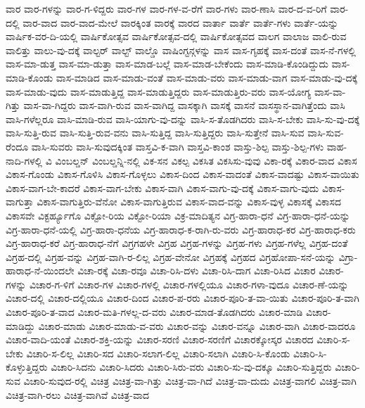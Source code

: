 {ವಾರ
ವಾರ-ಗಳನ್ನು
ವಾರ-ಗ-ಳಿದ್ದರು
ವಾರ-ಗಳ
ವಾರ-ಗಳ-ವ-ರೆಗೆ
ವಾರ-ಗಳು
ವಾರ-ಣಾಸಿ
ವಾರ-ದ-ವ-ರಿಗೆ
ವಾರ-ದಲ್ಲಿ
ವಾರ-ವಾದ
ವಾರ-ವಾದ-ಮೇಲೆ
ವಾರಕ್ಕಿಂತ
ವಾರಕ್ಕೆ
ವಾರದ
ವಾರ್ತಾ
ವಾರ್ತೆ
ವಾರ್ತೆ-ಗಳು
ವಾರ್ತೆ-ಯನ್ನು
ವಾರ್ಷಿಕ-ವರ-ದಿ-ಯಲ್ಲಿ
ವಾರ್ಷಿಕೋತ್ಸವ
ವಾರ್ಷಿಕೋತ್ಸವ-ದಲ್ಲಿ
ವಾರ್ಷಿಕೋತ್ಸವದ
ವಾಲಗ
ವಾಲಾಜ
ವಾಲಿ-ರುವ
ವಾಲಿತ್ತು
ವಾಲು-ವು-ದಕ್ಕೆ
ವಾಲ್ಟರ್
ವಾಲ್ಟ್
ವಾಲ್ಡೊ
ವಾಷಿಂಗ್ಟನ್ಗಳನ್ನು
ವಾಸ
ವಾಸ-ಗೃಹಕ್ಕೆ
ವಾಸ-ದಂತೆ
ವಾಸ-ನೆ-ಗಳಲ್ಲಿ
ವಾಸ-ಮಾ-ಡುತ್ತ
ವಾಸ-ಮಾ-ಡುತ್ತಾ
ವಾಸ-ಮಾಡ-ಬಲ್ಲೆ
ವಾಸ-ಮಾಡ-ಬೇಕೆಂದು
ವಾಸ-ಮಾಡಿ-ಕೊಂಡಿದ್ದುದು
ವಾಸ-ಮಾಡಿ-ಕೊಂಡು
ವಾಸ-ಮಾಡಿದ
ವಾಸ-ಮಾಡು-ವಂತೆ
ವಾಸ-ಮಾಡು-ವರು
ವಾಸ-ಮಾಡು-ವಾಗ
ವಾಸ-ಮಾಡು-ವು-ದಕ್ಕೆ
ವಾಸ-ಮಾಡು-ವುದು
ವಾಸ-ಮಾಡುತ್ತಿದ್ದ
ವಾಸ-ಮಾಡುತ್ತಿದ್ದರು
ವಾಸ-ಮಾಡುತ್ತಿರು-ವರು
ವಾಸ-ಯೋಗ್ಯ
ವಾಸ-ವಾ-ಗಿತ್ತು
ವಾಸ-ವಾ-ಗಿದ್ದರು
ವಾಸ-ವಾಗಿ-ರುವ
ವಾಸ-ವಾಗಿದ್ದ
ವಾಸಕ್ಕಾಗಿ
ವಾಸಕ್ಕೆ
ವಾಸನೆ
ವಾಸಸ್ಥಾನ-ವಾಗಿತ್ತೆಂದು
ವಾಸಿ
ವಾಸಿ-ಗಳೆಲ್ಲರೂ
ವಾಸಿ-ಮಾಡಿ-ರುವ
ವಾಸಿ-ಯಾಗು-ವು-ದನ್ನು
ವಾಸಿ-ಸ-ತೊಡಗಿದರು
ವಾಸಿ-ಸ-ಬೇಕು
ವಾಸಿ-ಸು-ವು-ದಕ್ಕೆ
ವಾಸಿ-ಸುತ್ತಿ-ರುವ
ವಾಸಿ-ಸುತ್ತಿ-ರುವ-ವನು
ವಾಸಿ-ಸುತ್ತಿದ್ದ
ವಾಸಿ-ಸುತ್ತಿದ್ದರು
ವಾಸಿ-ಸುತ್ತೇನೆ
ವಾಸಿ-ಸುವ
ವಾಸಿ-ಸುವ-ರೆಂದೂ
ವಾಸಿ-ಸುವರು
ವಾಸಿ-ಸುವುದಕ್ಕಿಂತ
ವಾಸ್ತವಿ-ಕ-ವಾಗಿ
ವಾಸ್ತವಿ-ಕಾಂಶ
ವಾಸ್ತು-ಶಿಲ್ಪ
ವಾಸ್ತು-ಶಿಲ್ಪ-ಗಳು
ವಾಹ-ನಾದಿ-ಗಳಲ್ಲಿ
ವಿ
ವಿಂಬಲ್ಡನ್
ವಿಂಬಲ್ಡನ್ನಿ-ನಲ್ಲಿ
ವಿಕ-ಸನ
ವಿಕಲ್ಪ
ವಿಕಸಿತ
ವಿಕಸಿಸು-ವುವು
ವಿಕಾ-ರಕ್ಕೆ
ವಿಕಾರ-ವಾದ
ವಿಕಾಸ
ವಿಕಾಸ-ಗೊಂಡು
ವಿಕಾಸ-ಗೊಳಿಸಿ
ವಿಕಾಸ-ಗೊಳ್ಳಲು
ವಿಕಾಸ-ದಿಂದ
ವಿಕಾಸ-ವಾದಂತೆ
ವಿಕಾಸ-ವಾದಷ್ಟು
ವಿಕಾಸ-ವಾಯಿತು
ವಿಕಾಸ-ವಾಗ-ಬೇ-ಕಾದರೆ
ವಿಕಾಸ-ವಾಗ-ಬೇಕು
ವಿಕಾಸ-ವಾಗಿ
ವಿಕಾಸ-ವಾಗು-ವು-ದಕ್ಕೆ
ವಿಕಾಸ-ವಾಗು-ವುದು
ವಿಕಾಸ-ವಾಗುತ್ತಾ
ವಿಕಾಸ-ವಾಗುತ್ತಿರು-ವೆನೋ
ವಿಕಾಸ-ವಾಗುತ್ತಿರುವ
ವಿಕಾಸ-ವಾದ-ವನ್ನು
ವಿಕಾಸ-ವುಳ್ಳ
ವಿಕಾಸಕ್ಕೆ
ವಿಕಾಸದ
ವಿಕಾಸವೇ
ವಿಕ್ಟರ್ಹ್ಯೂಗೊ
ವಿಕ್ಟೋ-ರಿಯ
ವಿಕ್ಟೋ-ರಿಯಾ
ವಿಕ್ರ-ಮಾದಿತ್ಯನ
ವಿಗ್ರ-ಹಾರಾ-ಧನೆ
ವಿಗ್ರ-ಹಾರಾ-ಧನೆ-ಯನ್ನು
ವಿಗ್ರ-ಹಾರಾ-ಧನೆ-ಯಲ್ಲಿ
ವಿಗ್ರ-ಹಾರಾ-ಧನೆಯ
ವಿಗ್ರ-ಹಾರಾಧ-ಕ-ರಾಗಿ-ರು-ವರು
ವಿಗ್ರ-ಹಾರಾಧ-ಕರ
ವಿಗ್ರ-ಹಾರಾಧ-ಕರು
ವಿಗ್ರ-ಹಾರಾಧ-ಕರೆ
ವಿಗ್ರ-ಹಾರಾಧ-ನೆಗೆ
ವಿಗ್ರಗಹಳೇ
ವಿಗ್ರಹ
ವಿಗ್ರಹ-ಗಳನ್ನು
ವಿಗ್ರಹ-ಗಳು
ವಿಗ್ರಹ-ಗಳೆಲ್ಲ
ವಿಗ್ರಹ-ದಂತೆ
ವಿಗ್ರಹ-ದಲ್ಲಿ
ವಿಗ್ರಹ-ವನ್ನು
ವಿಗ್ರಹ-ವಾಗಿ-ರ-ಲಿಲ್ಲ
ವಿಗ್ರಹ-ವೇನೋ
ವಿಗ್ರಹಕ್ಕೆ
ವಿಗ್ರಹದ
ವಿಗ್ರಹೋಪಾ-ಸನೆ-ಯನ್ನು
ವಿಗ್ರಾ-ಹಾರಾಧ-ನೆ-ಯಿಂದಲೇ
ವಿಚಾ-ರಕ್ಕೆ
ವಿಚಾ-ರವೂ
ವಿಚಾ-ರಿಸಿ-ದಳು
ವಿಚಾ-ರಿಸಿ-ದಾಗ
ವಿಚಾ-ರಿಸಿದ
ವಿಚಾರ
ವಿಚಾರ-ಗಳನ್ನು
ವಿಚಾರ-ಗ-ಳಿಗೆ
ವಿಚಾರ-ಗಳ
ವಿಚಾರ-ಗಳಲ್ಲಿ
ವಿಚಾರ-ಗಳಲ್ಲಿಯೂ
ವಿಚಾರ-ಗಳಾ-ವುದೂ
ವಿಚಾರ-ಣೆ-ಯನ್ನು
ವಿಚಾರ-ದಲ್ಲಿ
ವಿಚಾರ-ದಲ್ಲಿಯೂ
ವಿಚಾರ-ದಿಂದ
ವಿಚಾರ-ಪ-ರರು
ವಿಚಾರ-ಪೂರಿ-ತ-ವಾ-ಯಿತು
ವಿಚಾರ-ಪೂರಿ-ತ-ವಾಗಿ
ವಿಚಾರ-ಪೂರಿ-ತ-ವಾದ
ವಿಚಾರ-ಮತಿ-ಗಳಲ್ಲ-ದ-ವರು
ವಿಚಾರ-ಮಾಡ-ತೊಡಗಿದರು
ವಿಚಾರ-ಮಾಡಿ
ವಿಚಾರ-ಮಾಡಿದ್ದು
ವಿಚಾರ-ಮಾಡು
ವಿಚಾರ-ಮಾಡು-ವ-ವರು
ವಿಚಾರ-ವನ್ನು
ವಿಚಾರ-ವನ್ನೂ
ವಿಚಾರ-ವಾಗಿ
ವಿಚಾರ-ವಾದರೂ
ವಿಚಾರ-ವಾದಿ-ಯಂತೆ
ವಿಚಾರ-ಶಕ್ತಿ-ಯನ್ನು
ವಿಚಾರ-ಸರಣಿ
ವಿಚಾರ-ಸರಣಿಗೆ
ವಿಚಾರಕ್ಕೋಸ್ಕರ
ವಿಚಾರದ
ವಿಚಾರಿ-ಸ-ಬೇಕು
ವಿಚಾರಿ-ಸ-ಲಿಲ್ಲ
ವಿಚಾರಿ-ಸದ
ವಿಚಾರಿ-ಸಲಾಗ-ಲಿಲ್ಲ
ವಿಚಾರಿ-ಸಲಾಗಿ
ವಿಚಾರಿ-ಸಿ-ಕೊಂಡು
ವಿಚಾರಿ-ಸಿ-ಕೊಳ್ಳುತ್ತಿದ್ದರು
ವಿಚಾರಿ-ಸಿದನು
ವಿಚಾರಿ-ಸಿದರು
ವಿಚಾರಿ-ಸಿರು-ವರು
ವಿಚಾರಿ-ಸು-ವು-ದಕ್ಕೂ
ವಿಚಾರಿ-ಸುತ್ತಿದ್ದರು
ವಿಚಾರಿ-ಸುವ
ವಿಚಾರಿ-ಸುವುದ-ರಲ್ಲಿ
ವಿಚಿತ್ರ
ವಿಚಿತ್ರ-ವಾ-ಗಿತ್ತು
ವಿಚಿತ್ರ-ವಾ-ಗಿದೆ
ವಿಚಿತ್ರ-ವಾ-ದುದು
ವಿಚಿತ್ರ-ವಾಗಲಿ
ವಿಚಿತ್ರ-ವಾಗಿ
ವಿಚಿತ್ರ-ವಾಗಿ-ರಲು
ವಿಚಿತ್ರ-ವಾಗಿವೆ
ವಿಚಿತ್ರ-ವಾದ
}
